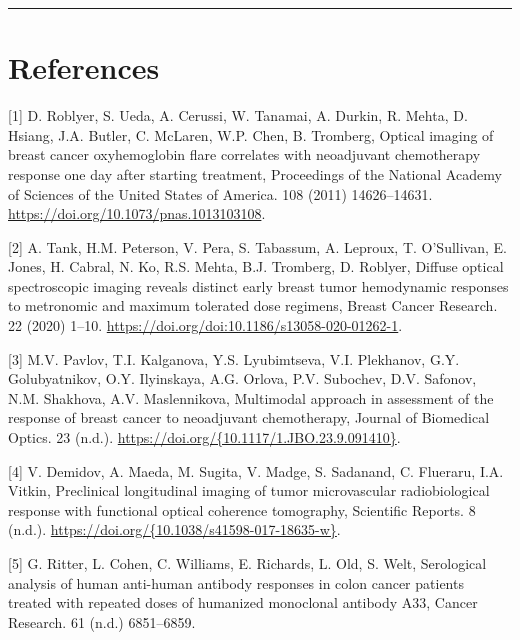 \documentclass[
]{article}
\begin{document}
\FloatBarrier

\begin{center}\rule{0.5\linewidth}{0.5pt}\end{center}

\newpage

\hypertarget{references}{%
\section{References}\label{references}}

\hypertarget{refs}{}
\leavevmode\hypertarget{ref-roblyer2011}{}%
{[}1{]} D. Roblyer, S. Ueda, A. Cerussi, W. Tanamai, A. Durkin, R. Mehta, D. Hsiang, J.A. Butler, C. McLaren, W.P. Chen, B. Tromberg, Optical imaging of breast cancer oxyhemoglobin flare correlates with neoadjuvant chemotherapy response one day after starting treatment, Proceedings of the National Academy of Sciences of the United States of America. 108 (2011) 14626--14631. \url{https://doi.org/10.1073/pnas.1013103108}.

\leavevmode\hypertarget{ref-tank2020}{}%
{[}2{]} A. Tank, H.M. Peterson, V. Pera, S. Tabassum, A. Leproux, T. O'Sullivan, E. Jones, H. Cabral, N. Ko, R.S. Mehta, B.J. Tromberg, D. Roblyer, Diffuse optical spectroscopic imaging reveals distinct early breast tumor hemodynamic responses to metronomic and maximum tolerated dose regimens, Breast Cancer Research. 22 (2020) 1--10. \url{https://doi.org/doi:10.1186/s13058-020-01262-1}.

\leavevmode\hypertarget{ref-pavlov2018}{}%
{[}3{]} M.V. Pavlov, T.I. Kalganova, Y.S. Lyubimtseva, V.I. Plekhanov, G.Y. Golubyatnikov, O.Y. Ilyinskaya, A.G. Orlova, P.V. Subochev, D.V. Safonov, N.M. Shakhova, A.V. Maslennikova, Multimodal approach in assessment of the response of breast cancer to neoadjuvant chemotherapy, Journal of Biomedical Optics. 23 (n.d.). \href{https://doi.org/\%7B10.1117/1.JBO.23.9.091410\%7D}{https://doi.org/\{10.1117/1.JBO.23.9.091410\}}.

\leavevmode\hypertarget{ref-demidov2018}{}%
{[}4{]} V. Demidov, A. Maeda, M. Sugita, V. Madge, S. Sadanand, C. Flueraru, I.A. Vitkin, Preclinical longitudinal imaging of tumor microvascular radiobiological response with functional optical coherence tomography, Scientific Reports. 8 (n.d.). \href{https://doi.org/\%7B10.1038/s41598-017-18635-w\%7D}{https://doi.org/\{10.1038/s41598-017-18635-w\}}.

\leavevmode\hypertarget{ref-ritter2001}{}%
{[}5{]} G. Ritter, L. Cohen, C. Williams, E. Richards, L. Old, S. Welt, Serological analysis of human anti-human antibody responses in colon cancer patients treated with repeated doses of humanized monoclonal antibody A33, Cancer Research. 61 (n.d.) 6851--6859.
\end{document}
